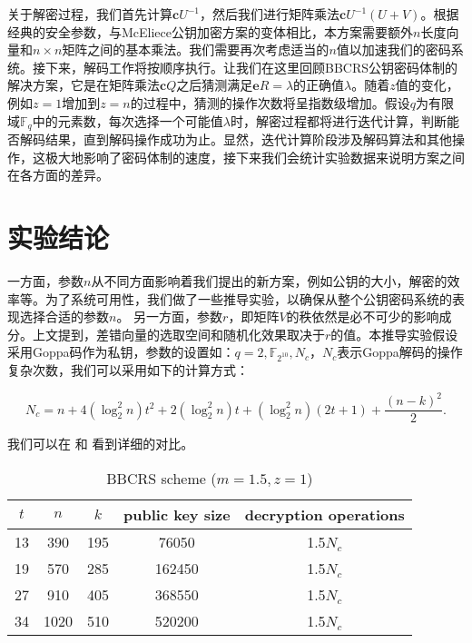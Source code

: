 关于解密过程，我们首先计算$\mathbf{c}U^{-1}$，然后我们进行矩阵乘法$\mathbf{c}U^{-1}(U + V)$。根据经典的安全参数，与McEliece公钥加密方案的变体相比，本方案需要额外$n$长度向量和$n \times n$矩阵之间的基本乘法。我们需要再次考虑适当的$n$值以加速我们的密码系统。接下来，解码工作将按顺序执行。让我们在这里回顾BBCRS公钥密码体制的解决方案，它是在矩阵乘法$\mathbf{c}Q$之后猜测满足$\mathbf{e}R = \lambda$的正确值$\lambda$。随着$z$值的变化，例如$z = 1$增加到$z = n$的过程中，猜测的操作次数将呈指数级增加。假设$q$为有限域$\mathbb{F}_q$中的元素数，每次选择一个可能值$\lambda$时，解密过程都将进行迭代计算，判断能否解码结果，直到解码操作成功为止。显然，迭代计算阶段涉及解码算法和其他操作，这极大地影响了密码体制的速度，接下来我们会统计实验数据来说明方案之间在各方面的差异。

\section{实验结论}
一方面，参数$n$从不同方面影响着我们提出的新方案，例如公钥的大小，解密的效率等。为了系统可用性，我们做了一些推导实验，以确保从整个公钥密码系统的表现选择合适的参数$n$。 另一方面，参数$r$，即矩阵$V$的秩依然是必不可少的影响成分。上文提到，差错向量的选取空间和随机化效果取决于$r$的值。本推导实验假设采用Goppa码作为私钥，参数的设置如：$q = 2, \mathbb{F}_{2^{10}}, N_c$，$N_c$表示Goppa解码的操作复杂次数，我们可以采用如下的计算方式：

\begin{equation}
	N_c=n+4(\log_2^2n)t^2+2(\log_2^2n)t+(\log_2^2n)(2t+1)+\frac{(n-k)^2}{2}.
\end{equation}

我们可以在 和 看到详细的对比。

\begin{table}[h]
	\begin{center}
		\caption{BBCRS scheme ($m=1.5,z=1$)}\label{bbcrsScheme}
		\begin{tabular}{ccccc}
			\hline
			$t$ & $n$& $k$ & public key size& decryption operations\\
			\hline
			13& 390& 195& 76050& 1.5$N_c$\\
			19& 570& 285& 162450& 1.5$N_c$\\
			27& 910& 405& 368550& 1.5$N_c$\\
			34& 1020& 510& 520200& 1.5$N_c$\\
			\hline
		\end{tabular}
	\end{center}
\end{table}

